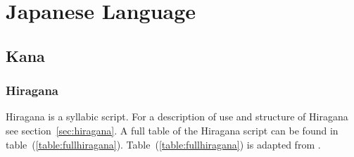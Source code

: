 
\chapter{Japanese Language}
\label{chap:app:japaneselanguage}






\section{Kana }
\label{sec:app:kana}

\subsection{Hiragana }
\label{sec:app:hiragana}

Hiragana is a syllabic script. For a description of use and structure of
Hiragana see section~\ref{sec:hiragana}. A full table of the Hiragana script can 
be found in table~(\ref{table:fullhiragana}).
Table~(\ref{table:fullhiragana}) is adapted from .

